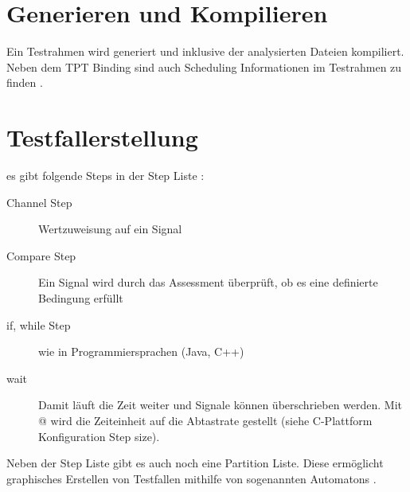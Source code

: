 \section*{Generieren und Kompilieren}
Ein Testrahmen wird generiert und inklusive der analysierten Dateien kompiliert.
Neben dem TPT Binding sind auch Scheduling Informationen im Testrahmen zu finden \cite[vgl.][S. 868 ff.]{userguide}.

\section*{Testfallerstellung}
es gibt folgende Steps in der Step Liste \cite[vgl.][S. 437 ff.]{userguide}:
\begin{description}
\item[Channel Step] Wertzuweisung auf ein Signal
\item[Compare Step] Ein Signal wird durch das Assessment überprüft, ob es eine definierte Bedingung erfüllt
\item[if, while Step] wie in Programmiersprachen (Java, C++)
\item[wait] Damit läuft die Zeit weiter und Signale können überschrieben werden. Mit @ wird die Zeiteinheit auf die Abtastrate gestellt (siehe C-Plattform Konfiguration Step size).
\end{description}
Neben der Step Liste gibt es auch noch eine Partition Liste. Diese ermöglicht graphisches Erstellen von Testfallen mithilfe von sogenannten Automatons \cite[vgl.][S. 437 ff.]{userguide}.
